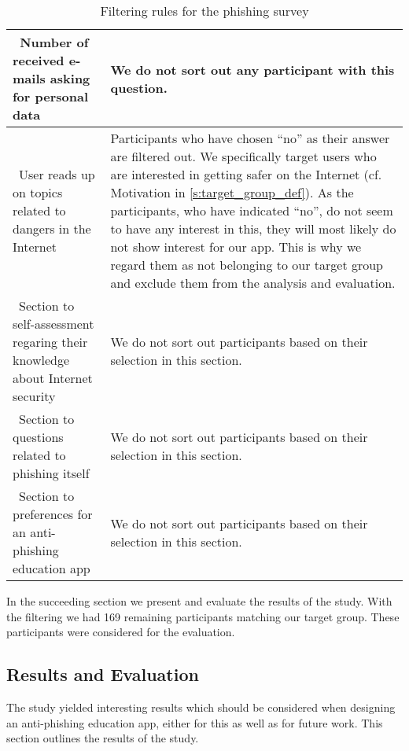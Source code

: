 \begin{table}[hHtbp]
\begin{tabular}{ | p{4.5cm} | p{10cm} |}
 \\
    \hline\ Number of received e-mails asking for personal data  & We do not sort out any participant with this question.
 \\
    \hline\ User reads up on topics related to dangers in the Internet  &  Participants who have chosen ``no'' as their answer are filtered out.
 We specifically target users who are interested in getting safer on the Internet (cf. Motivation in \autoref{s:target_group_def}).
 As the participants, who have indicated ``no'', do not seem to have any interest in this, they will most likely do not show interest for our app.
This is why we regard them as not belonging to our target group and exclude them from the analysis and evaluation.
\\
    \hline\  Section to self-assessment regaring their knowledge about Internet security &  We do not sort out participants based on their selection in this section.
\\
		\hline\  Section to questions related to phishing itself & We do not sort out participants based on their selection in this section.
 \\
    \hline\  Section to preferences for an anti-phishing education app & We do not sort out participants based on their selection in this section.
\\
    \hline
    \end{tabular}
    \caption{Filtering rules for the phishing survey}
    \label{table:prestudy_filter}
    
\end{table}

In the succeeding section we present and evaluate the results of the study.
 With the filtering we had 169 remaining participants matching our target group.
These participants were considered for the evaluation.

\subsection{Results and Evaluation}
\label{s:survey_results}
The study yielded interesting results which should be considered when designing an anti-phishing education app, either for this as well as for future work.
 This section outlines the results of the study.


